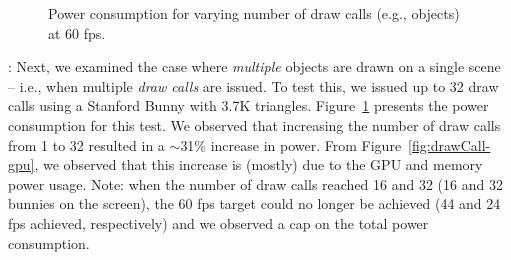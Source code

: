 


\begin{figure}[t]
    \centering
    \vspace{-1ex}
    \vspace{-2ex}
    \caption{Power consumption for varying number of draw calls 
            (e.g., objects) at 60 fps.}
    \label{fig:drawCall}
\end{figure}



:
%
%
Next, we examined the case where \textit{multiple} objects are drawn on a single scene -- i.e., when multiple \emph{draw calls} are issued. To test this, we issued up to 32 draw calls using a Stanford Bunny with 
3.7K triangles. Figure~\ref{fig:drawCall} presents the power consumption for this test. We observed that increasing the number of draw calls from 1 to 32 resulted in a $\sim$31\% increase in power. From Figure~\ref{fig:drawCall-gpu}, we observed that this increase is (mostly) due to the GPU and memory power usage. Note: when the number of draw calls reached 16 and 32 (16 and 32 bunnies on the screen), the 60 fps target could no longer be achieved (44 and 24 fps achieved, respectively) and we observed a cap on the total power consumption.

%
%


%

